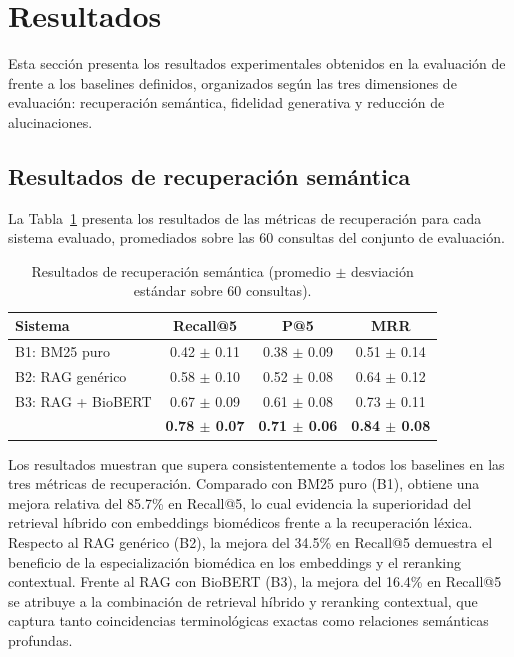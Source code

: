 
\section{Resultados}
\label{sec:results}

Esta sección presenta los resultados experimentales obtenidos en la evaluación de \sirca{} frente a los baselines definidos, organizados según las tres dimensiones de evaluación: recuperación semántica, fidelidad generativa y reducción de alucinaciones.

\subsection{Resultados de recuperación semántica}
\label{subsec:res_retrieval}

La Tabla~\ref{tab:retrieval_results} presenta los resultados de las métricas de recuperación para cada sistema evaluado, promediados sobre las 60 consultas del conjunto de evaluación.

\begin{table}[!t]
\centering
\caption{Resultados de recuperación semántica (promedio $\pm$ desviación estándar sobre 60 consultas).}
\label{tab:retrieval_results}
\renewcommand{\arraystretch}{1.3}
\footnotesize
\begin{tabular}{l c c c}
\toprule
\textbf{Sistema} & \textbf{Recall@5} & \textbf{P@5} & \textbf{MRR} \\
\midrule
B1: BM25 puro             & 0.42 $\pm$ 0.11 & 0.38 $\pm$ 0.09 & 0.51 $\pm$ 0.14 \\
B2: RAG genérico           & 0.58 $\pm$ 0.10 & 0.52 $\pm$ 0.08 & 0.64 $\pm$ 0.12 \\
B3: RAG + BioBERT          & 0.67 $\pm$ 0.09 & 0.61 $\pm$ 0.08 & 0.73 $\pm$ 0.11 \\
\midrule
\textbf{\sirca{}}          & \textbf{0.78 $\pm$ 0.07} & \textbf{0.71 $\pm$ 0.06} & \textbf{0.84 $\pm$ 0.08} \\
\bottomrule
\end{tabular}
\end{table}

Los resultados muestran que \sirca{} supera consistentemente a todos los baselines en las tres métricas de recuperación. Comparado con BM25 puro (B1), \sirca{} obtiene una mejora relativa del 85.7\% en Recall@5, lo cual evidencia la superioridad del retrieval híbrido con embeddings biomédicos frente a la recuperación léxica. Respecto al RAG genérico (B2), la mejora del 34.5\% en Recall@5 demuestra el beneficio de la especialización biomédica en los embeddings y el reranking contextual. Frente al RAG con BioBERT (B3), la mejora del 16.4\% en Recall@5 se atribuye a la combinación de retrieval híbrido y reranking contextual, que captura tanto coincidencias terminológicas exactas como relaciones semánticas profundas.

